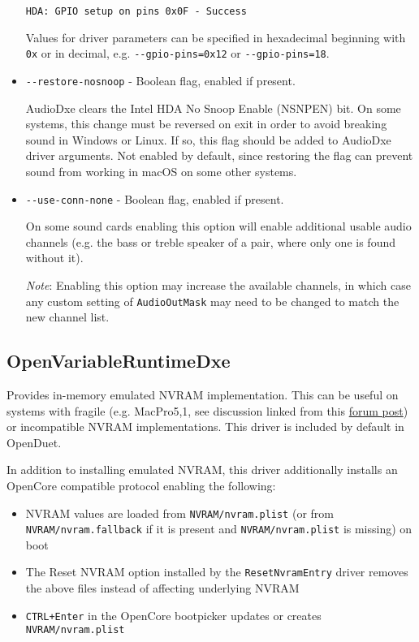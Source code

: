 \documentclass[]{article}
\makeatletter
\providecommand{\tightlist}{%
  \setlength{\itemsep}{0pt}\setlength{\parskip}{0pt}}
\renewcommand{\label}[1]{%
\zref@wrapper@immediate{\oldlabel{#1}}}  %
\makeatother
\begin{document}
\begin{itemize}
  \texttt{HDA: GPIO setup on pins 0x0F - Success} \medskip

  Values for driver parameters can be specified in hexadecimal beginning with \texttt{0x} or
  in decimal, e.g. \texttt{-{}-gpio-pins=0x12} or \texttt{-{}-gpio-pins=18}. \medskip

	\item \texttt{-{}-restore-nosnoop} - Boolean flag, enabled if present. \medskip

  AudioDxe clears the Intel HDA No Snoop Enable (NSNPEN) bit. On some systems, this change must
  be reversed on exit in order to avoid breaking sound in Windows or Linux. If so, this flag should
  be added to AudioDxe driver arguments.
  Not enabled by default, since restoring the flag can prevent sound from working in macOS on
  some other systems. \medskip

	\item \texttt{-{}-use-conn-none} - Boolean flag, enabled if present. \medskip

  On some sound cards enabling this option will enable additional usable audio channels (e.g.
  the bass or treble speaker of a pair, where only one is found without it).
  \medskip

  \emph{Note}: Enabling this option may increase the available channels, in which case any
  custom setting of \texttt{AudioOutMask} may need to be changed to match the new channel list.
  \medskip
\end{itemize}

\subsection{OpenVariableRuntimeDxe}\label{emunvram}

Provides in-memory emulated NVRAM implementation. This can be useful on systems with fragile
(e.g. MacPro5,1, see discussion linked from this \href{https://forums.macrumors.com/posts/30945127}{forum post})
or incompatible NVRAM implementations. This driver is included by default in OpenDuet.

In addition to installing emulated NVRAM, this driver additionally installs an OpenCore compatible
protocol enabling the following:

\begin{itemize}
\tightlist
  \item NVRAM values are loaded from \texttt{NVRAM/nvram.plist} (or from \texttt{NVRAM/nvram.fallback}
  if it is present and \texttt{NVRAM/nvram.plist} is missing) on boot
  \item The Reset NVRAM option installed by the \texttt{ResetNvramEntry} driver removes the above files instead
  of affecting underlying NVRAM
  \item \texttt{CTRL+Enter} in the OpenCore bootpicker updates or creates \texttt{NVRAM/nvram.plist}
\end{itemize}
\end{document}
